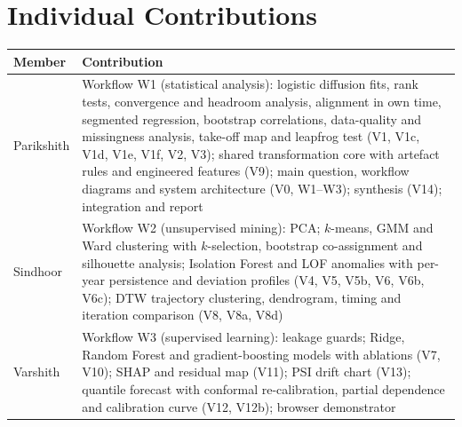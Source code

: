 \documentclass[conference,a4paper]{IEEEtran}
\begin{document}
\section*{Individual Contributions}
\begin{table}[!h]
\centering
\footnotesize
\begin{tabularx}{\columnwidth}{@{}l Y@{}}
\toprule
Member & Contribution \\
\midrule
Parikshith & Workflow W1 (statistical analysis): logistic diffusion fits, rank tests, convergence and
headroom analysis, alignment in own time, segmented regression, bootstrap correlations, data-quality and
missingness analysis, take-off map and leapfrog test (V1, V1c, V1d, V1e, V1f, V2, V3); shared transformation core with artefact rules and
engineered features (V9); main question, workflow diagrams and system architecture (V0, W1--W3);
synthesis (V14); integration and report \\
Sindhoor & Workflow W2 (unsupervised mining): PCA; $k$-means, GMM and Ward clustering with $k$-selection,
bootstrap co-assignment and silhouette analysis; Isolation Forest and LOF anomalies with per-year
persistence and deviation profiles (V4, V5, V5b, V6, V6b, V6c); DTW trajectory clustering,
dendrogram, timing and iteration comparison (V8, V8a, V8d) \\
Varshith & Workflow W3 (supervised learning): leakage guards; Ridge, Random Forest and gradient-boosting
models with ablations (V7, V10); SHAP and residual map (V11); PSI drift chart (V13); quantile forecast
with conformal re-calibration, partial dependence and calibration curve (V12, V12b); browser
demonstrator \\
\bottomrule
\end{tabularx}
\end{table}
\end{document}
